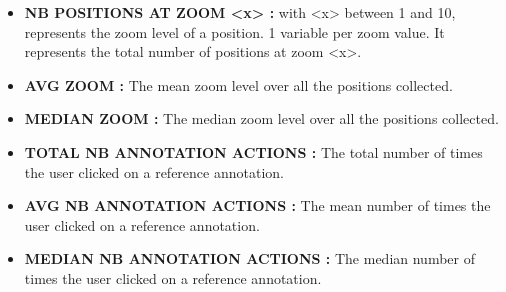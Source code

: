 \documentclass[a4paper,11pt]{report}
\numberwithin{figure}{chapter} %
\begin{document}
\begin{itemize}
    \item[\textbullet] \textbf{NB POSITIONS AT ZOOM <x> :} with <x> between 1 and 10, represents the zoom level of a position.
    1 variable per zoom value.
    It represents the total number of positions at zoom <x>.\\
    \item[\textbullet] \textbf{AVG ZOOM :} The mean zoom level over all the positions collected.\\
    \item[\textbullet] \textbf{MEDIAN ZOOM :} The median zoom level over all the positions collected.\\
    \item[\textbullet] \textbf{TOTAL NB ANNOTATION ACTIONS :} The total number of times the user clicked on a reference annotation.\\
    \item[\textbullet] \textbf{AVG NB ANNOTATION ACTIONS :} The mean number of times the user clicked on a reference annotation.\\
    \item[\textbullet] \textbf{MEDIAN NB ANNOTATION ACTIONS :} The median number of times the user clicked on a reference annotation.\\


\end{itemize}
\end{document}
